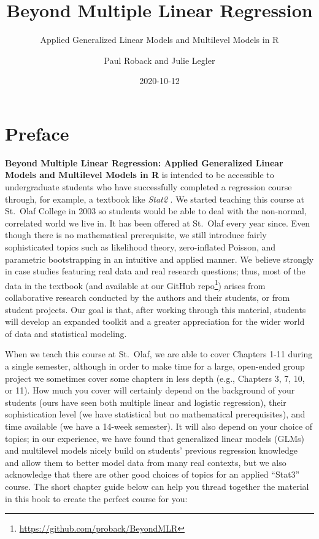 \documentclass[
]{krantz}
\title{Beyond Multiple Linear Regression}
\subtitle{Applied Generalized Linear Models and Multilevel Models in R}
\author{Paul Roback and Julie Legler}
\date{2020-10-12}
\renewcommand{\href}[2]{#2\footnote{\url{#1}}}
\begin{document}
\maketitle


\thispagestyle{empty}

\setlength{\abovedisplayskip}{-5pt}
\setlength{\abovedisplayshortskip}{-5pt}

{
\hypersetup{linkcolor=}
\setcounter{tocdepth}{2}
\tableofcontents
}
\hypertarget{preface}{%
\chapter*{Preface}\label{preface}}


\textbf{Beyond Multiple Linear Regression: Applied Generalized Linear Models and Multilevel Models in R} \citep{RProject} is intended to be accessible to undergraduate students who have successfully completed a regression course through, for example, a textbook like \emph{Stat2} \citep{Cannon2019}. We started teaching this course at St.~Olaf College in 2003 so students would be able to deal with the non-normal, correlated world we live in. It has been offered at St.~Olaf every year since. Even though there is no mathematical prerequisite, we still introduce fairly sophisticated topics such as likelihood theory, zero-inflated Poisson, and parametric bootstrapping in an intuitive and applied manner. We believe strongly in case studies featuring real data and real research questions; thus, most of the data in the textbook (and \href{https://github.com/proback/BeyondMLR}{available at our GitHub repo}) arises from collaborative research conducted by the authors and their students, or from student projects. Our goal is that, after working through this material, students will develop an expanded toolkit and a greater appreciation for the wider world of data and statistical modeling.

When we teach this course at St.~Olaf, we are able to cover Chapters 1-11 during a single semester, although in order to make time for a large, open-ended group project we sometimes cover some chapters in less depth (e.g., Chapters 3, 7, 10, or 11). How much you cover will certainly depend on the background of your students (ours have seen both multiple linear and logistic regression), their sophistication level (we have statistical but no mathematical prerequisites), and time available (we have a 14-week semester). It will also depend on your choice of topics; in our experience, we have found that generalized linear models (GLMs) and multilevel models nicely build on students' previous regression knowledge and allow them to better model data from many real contexts, but we also acknowledge that there are other good choices of topics for an applied ``Stat3'' course. The short chapter guide below can help you thread together the material in this book to create the perfect course for you:
\end{document}
